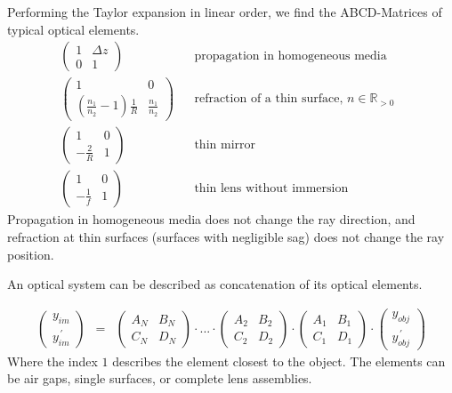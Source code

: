 \documentclass[12pt,a4paper,twoside,openright,BCOR10mm,headsepline,titlepage,abstracton,chapterprefix,final]{scrreprt}
\begin{document}
Performing the Taylor expansion in linear order, we find the ABCD-Matrices of typical optical elements. 
\begin{eqnarray}
 \begin{pmatrix}
  1 & \Delta z \\ 0 & 1
 \end{pmatrix}
 && \textrm{propagation in homogeneous media}
 \\
 \begin{pmatrix}
  1 & 0 \\ \left( \frac{n_1}{n_2} - 1 \right) \frac{1}{R} & \frac{n_1}{n_2}
 \end{pmatrix}
 && \textrm{refraction of a thin surface, $n \in \mathbb{R}_{>0}$ }
 \\
 \begin{pmatrix}
  1 & 0 \\ -\frac{2}{R} & 1
 \end{pmatrix}
 && \textrm{thin mirror}
 \\
 \begin{pmatrix}
  1 & 0 \\ -\frac{1}{f} & 1
 \end{pmatrix}
 && \textrm{thin lens without immersion}
\end{eqnarray}
Propagation in homogeneous media does not change the ray direction, and refraction at thin surfaces (surfaces with negligible sag) does not change the ray position.

An optical system can be described as concatenation of its optical elements.

\begin{eqnarray}
 \begin{pmatrix}
  y_{im} \\ y_{im}^{\,\prime}
 \end{pmatrix}
 &=&
 \begin{pmatrix}
  A_N & B_N \\ C_N & D_N
 \end{pmatrix}
 \cdot
 ...
 \cdot
 \begin{pmatrix}
  A_2 & B_2 \\ C_2 & D_2
 \end{pmatrix}
 \cdot
 \begin{pmatrix}
  A_1 & B_1 \\ C_1 & D_1
 \end{pmatrix}
 \cdot
 \begin{pmatrix}
  y_{obj} \\ y_{obj}^{\,\prime}
 \end{pmatrix}
\end{eqnarray}
Where the index $1$ describes the element closest to the object.
The elements can be air gaps, single surfaces, or complete lens assemblies.
\end{document}
